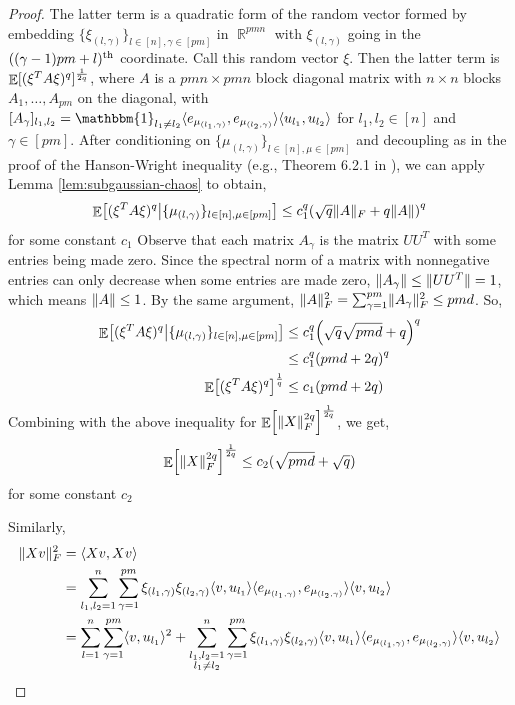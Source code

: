 \documentclass[11pt]{amsart}
\numberwithin{equation}{section}
\numberwithin{equation}{section}
\DeclareMathOperator{\E}{\mathbb{E}}
\DeclareMathOperator{\R}{\mathbb{R}}
\def \etc {,\ldots,}
\DeclarePairedDelimiter{\norm}{\lVert}{\rVert}
\DeclarePairedDelimiter{\ip}{\langle}{\rangle}
\DeclarePairedDelimiter{\paren}{(}{)}
\DeclarePairedDelimiter{\sqbr}{[}{]}
\begin{document}
\begin{proof}
The latter term is a quadratic form of the random vector formed by embedding $\{ \xi_{(l, \gamma)} \}_{l \in [n], \gamma \in [pm]}$ in $\R^{pmn}$ with $\xi_{(l, \gamma)}$ going in the $((\gamma-1)pm + l)\textsuperscript{th}$ coordinate. Call this random vector $\xi$. Then the latter term is $\E \sqbr{ \paren{\xi^T A \xi}^q }^\frac{1}{2q}$, where $A$ is a $pmn \times pmn$ block diagonal matrix with $n \times n$ blocks $A_1 \etc A_{pm}$ on the diagonal, with $[A_\gamma]_{l_1,l_2} =  \mathbbm{1}_{l_1 \neq l_2} \ip{e_{\mu_{(l_1, \gamma)}}, e_{\mu_{(l_2, \gamma)}}} \ip{u_{l_1}, u_{l_2}} $ for $l_1,l_2 \in [n]$ and $\gamma \in [pm]$. After conditioning on $\{\mu_{(l,\gamma)}\}_{l \in [n], \mu \in [pm]}$ and decoupling as in the proof of the Hanson-Wright inequality (e.g., Theorem 6.2.1 in \cite{vershynin2018high}), we can apply Lemma \ref{lem:subgaussian-chaos} to obtain, 
\[ \E \sqbr*{ \paren{\xi^T A \xi}^q \big\vert \{\mu_{(l,\gamma)}\}_{l \in [n], \mu \in [pm]} } \le c_1^q\paren*{\sqrt{q}\norm{A}_F + q\norm{A}}^q \]
for some constant $c_1$
Observe that each matrix $A_\gamma$ is the matrix $UU^T$ with some entries being made zero. Since the spectral norm of a matrix with nonnegative entries can only decrease when some entries are made zero, $\norm{A_\gamma} \le \norm{UU^T} = 1$, which means $\norm{A} \le 1$. By the same argument, $\norm{A}_F^2 = \sum_{\gamma=1}^{pm} \norm{A_\gamma}_F^2 \le pmd$. So,
\begin{align*}
    \E \sqbr*{ \paren{\xi^T A \xi}^q \big\vert \{\mu_{(l,\gamma)}\}_{l \in [n], \mu \in [pm]} } &\le c_1^q\paren*{\sqrt{q}\sqrt{pmd} + q}^q \\
    &\le  c_1^q\paren*{pmd + 2q}^q \\
    \E \sqbr*{ \paren{\xi^T A \xi}^q }^\frac{1}{q} &\le c_1\paren*{pmd + 2q}
\end{align*}
Combining with the above inequality for $\E \sqbr*{\norm{X}^{2q}_F}^\frac{1}{2q}$, we get, 
\[ \E \sqbr*{\norm{X}^{2q}_F}^\frac{1}{2q} \le c_2(\sqrt{pmd} + \sqrt{q}) \]
for some constant $c_2$

Similarly,
\begin{align*}
        \norm{Xv}^2_F &= \ip{Xv, Xv} \\
        &= \sum_{l_1, l_2 =1}^n \sum_{\gamma=1}^{pm}  \xi_{(l_1, \gamma)} \xi_{(l_2, \gamma)} \ip{v, u_{l_1}} \ip{e_{\mu_{(l_1, \gamma)}}, e_{\mu_{(l_2, \gamma)}}} \ip{v, u_{l_2}}  \\
        &= \sum_{l =1}^n \sum_{\gamma=1}^{pm} \ip{v, u_{l_1}}^2  + \sum_{\substack{l_1, l_2 =1 \\ l_1 \neq l_2}}^n \sum_{\gamma=1}^{pm} \xi_{(l_1, \gamma)} \xi_{(l_2, \gamma)} \ip{v, u_{l_1}} \ip{e_{\mu_{(l_1, \gamma)}}, e_{\mu_{(l_2, \gamma)}}} \ip{v, u_{l_2}}  \\
    \end{align*}


\end{proof}
\end{document}
